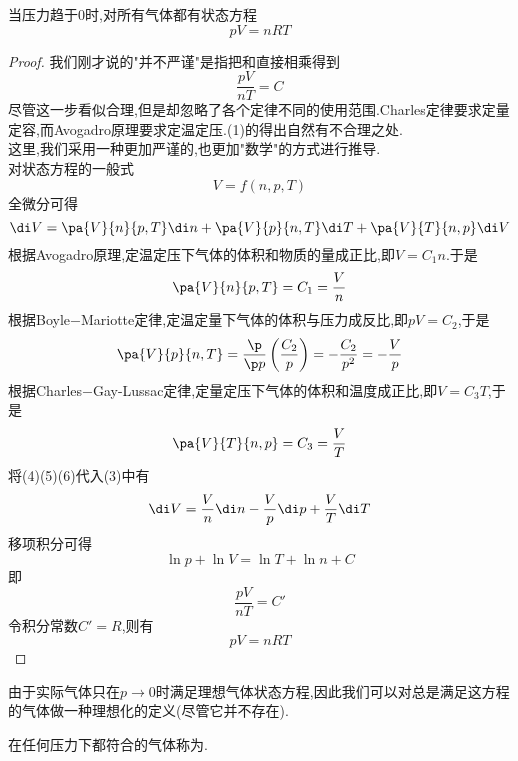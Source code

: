 \documentclass{ctexart}
\begin{document}
\begin{theorem}[1A.2.3 理想气体状态方程]
    当压力趋于$0$时,对所有气体都有状态方程
    \[pV=nRT\]

\end{theorem}
\begin{proof}
    我们刚才说的"并不严谨"是指把和直接相乘得到
    \begin{equation}
        \dfrac{pV}{nT}=C
    \end{equation}
    尽管这一步看似合理,但是却忽略了各个定律不同的使用范围.Charles定律要求定量定容,而Avogadro原理要求定温定压.(1)的得出自然有不合理之处.\\
    这里,我们采用一种更加严谨的,也更加"数学"的方式进行推导.\\
    对状态方程的一般式
    \begin{equation}
        V=f(n,p,T)
    \end{equation}
    全微分可得
    \begin{equation}
        \di V=\pa{V}{n}{p,T}\di n+\pa{V}{p}{n,T}\di T+\pa{V}{T}{n,p}\di V
    \end{equation}
    根据Avogadro原理,定温定压下气体的体积和物质的量成正比,即$V=C_1n$.于是
    \begin{equation}
        \pa{V}{n}{p,T}=C_1=\dfrac{V}{n}
    \end{equation}
    根据Boyle$-$Mariotte定律,定温定量下气体的体积与压力成反比,即$pV=C_2$,于是
    \begin{equation}
        \pa{V}{p}{n,T}=\dfrac{\p}{\p p}\left(\dfrac{C_2}p\right)=-\dfrac{C_2}{p^2}=-\dfrac{V}{p}
    \end{equation}
    根据Charles$-$Gay-Lussac定律,定量定压下气体的体积和温度成正比,即$V=C_3T$,于是
    \begin{equation}
        \pa{V}{T}{n,p}=C_3=\dfrac{V}{T}
    \end{equation}
    将(4)(5)(6)代入(3)中有
    \begin{equation}
        \di V=\dfrac{V}{n}\di n-\dfrac{V}{p}\di p+\dfrac{V}{T}\di T
    \end{equation}
    移项积分可得
    \begin{equation}
        \ln p+\ln V=\ln T+\ln n+C
    \end{equation}
    即
    \begin{equation}
        \dfrac{pV}{nT}=C'
    \end{equation}
    令积分常数$C'=R$,则有
    \begin{equation}
        pV=nRT
    \end{equation}
    
\end{proof}
\setcounter{equation}{0}
由于实际气体只在$p\to0$时满足理想气体状态方程,因此我们可以对总是满足这方程的气体做一种理想化的定义(尽管它并不存在).
\begin{definition}[1A.2.4]
    在任何压力下都符合的气体称为.
\end{definition}
\end{document}
